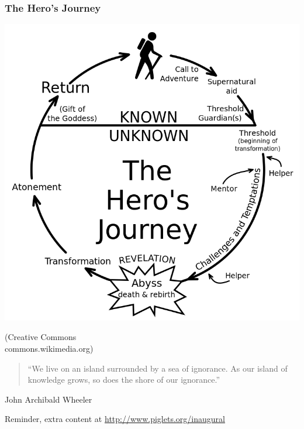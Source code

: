 \documentclass{beamer}
\begin{document}
\begin{frame}
  \frametitle{The Hero's Journey}
  
%  
  \begin{center}
  \includegraphics[width= 6 cm]{png/Heroesjourney.png}
  
  \small{(Creative Commons \\ commons.wikimedia.org)}

  \end{center}
\end{frame}


\begin{frame}
\begin{center}
\begin{block}{}
\begin{quote}
``We live on an island surrounded by a sea of ignorance. As our island of knowledge grows, so does the shore of our ignorance.''
\end{quote}
\end{block}
\hfill John Archibald Wheeler
\end{center}

\pause
\bigskip
Reminder, extra content at \url{http://www.piglets.org/inaugural}

\end{frame}
\end{document}
